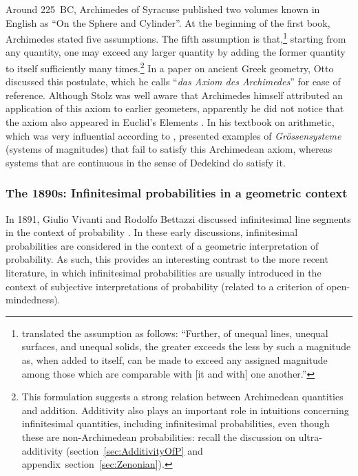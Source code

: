 Around 225~BC, Archimedes of Syracuse published two volumes known in English as ``On the Sphere and Cylinder''. At the beginning of the first book, Archimedes stated five assumptions. The fifth assumption is that,\footnote{\citet[p.~4]{Heath:1897} translated the assumption as follows: ``Further, of unequal lines, unequal surfaces, and unequal solids, the greater exceeds the less by such a magnitude as, when added to itself, can be made to exceed any assigned magnitude among those which are comparable with [it and with] one another.''} starting from any quantity, one may exceed any larger quantity by adding the former quantity to itself sufficiently many times.\footnote{This formulation suggests a strong relation between Archimedean quantities and addition. Additivity also plays an important role in intuitions concerning infinitesimal quantities, including infinitesimal probabilities, even though these are non-Archimedean probabilities: recall the discussion on ultra-additivity (section~\ref{sec:AdditivityOfP} and appendix~section~\ref{sec:Zenonian}).}
In a paper on ancient Greek geometry, Otto \citet{Stolz:1883} discussed this postulate, which he calls ``\textit{das Axiom des Archimedes}'' for ease of reference. Although Stolz was well aware that Archimedes himself attributed an application of this axiom to earlier geometers, apparently he did not notice that the axiom also appeared in Euclid's Elements \citep[p.~888]{Bair-etal:2013}.
In his textbook on arithmetic, which was very influential according to \citet[p.~5]{Ehrlich:2006}, \citet{Stolz:1885} presented examples of \textit{Gr{\"o}ssensysteme} (systems of magnitudes) that fail to satisfy this Archimedean axiom, whereas systems that are continuous in the sense of Dedekind do satisfy it.

\subsubsection{The 1890s: Infinitesimal probabilities in a geometric context}
In 1891, Giulio Vivanti and Rodolfo Bettazzi discussed infinitesimal line segments in the context of probability \citep[see][]{Ehrlich:2006}.
In these early discussions, infinitesimal probabilities are considered in the context of a geometric interpretation of probability. As such, this provides an interesting contrast to the more recent literature, in which infinitesimal probabilities are usually introduced in the context of subjective interpretations of probability (related to a criterion of open-mindedness).

